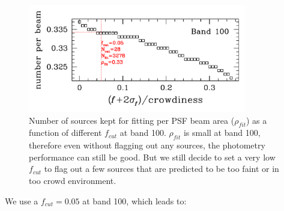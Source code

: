 \documentclass[11pt,a4paper]{article}
\begin{document}

\begin{figure}[H]
	\caption{Number of sources kept for fitting per PSF beam area ($\rho_{fit}$) as a function of different $f_{cut}$ at band 100. $\rho_{fit}$ is small at band 100, therefore even without flagging out any sources, the photometry performance can still be good. But we still decide to set a very low $f_{cut}$ to flag out a few sources that are predicted to be too faint or in too crowd environment.}
	\includegraphics[width=0.85\textwidth]{plot_cutting_flux_100_with_crow}
\end{figure}

We use a $f_{cut} = 0.05$ at band 100, which leads to: 
\end{document}
